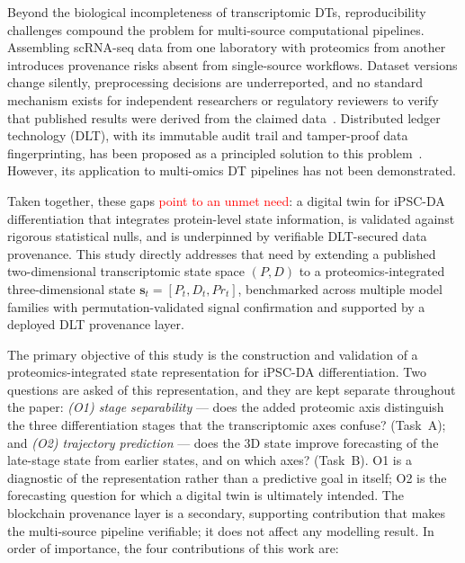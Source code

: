 \documentclass[5p,times,twocolumn]{elsarticle}
\newcommand{\rtag}[1]{}
\newenvironment{revblock}[1]{\par\color{red}\rtag{#1}\ignorespaces}{\par}
\newcommand{\lang}[1]{\textcolor{red}{#1}}
\begin{document}
Beyond the biological incompleteness of transcriptomic DTs, reproducibility challenges compound the problem for multi-source computational pipelines.
Assembling scRNA-seq data from one laboratory with proteomics from another introduces provenance risks absent from single-source workflows. Dataset versions change silently, preprocessing decisions are underreported, and no standard mechanism exists for independent researchers or regulatory reviewers to verify that published results were derived from the claimed data~\cite{johns2023data}.
Distributed ledger technology (DLT), with its immutable audit trail and tamper-proof data fingerprinting, has been proposed as a principled solution to this problem~\cite{kuo2017blockchain}. However, its application to multi-omics DT pipelines has not been demonstrated.

Taken together, these gaps \lang{point to an unmet need}: a digital twin for iPSC-DA
differentiation that integrates protein-level state
information, is validated against rigorous statistical
nulls, and is underpinned by verifiable DLT-secured
data provenance.
This study directly addresses that need by extending
a published two-dimensional transcriptomic state
space $(P, D)$ to a proteomics-integrated
three-dimensional state
$\mathbf{s}_{t} = [P_{t}, D_{t}, Pr_{t}]$,
benchmarked across multiple model families with
permutation-validated signal confirmation and
supported by a deployed DLT provenance layer.

\begin{revblock}{R1.1,R2.1,R2.21}
The primary objective of this study is
  the construction and validation of a proteomics-integrated
  state representation for iPSC-DA differentiation. Two
  questions are asked of this representation, and they are
  kept separate throughout the paper:
  \textit{(O1) stage separability} --- does the added
  proteomic axis distinguish the three differentiation stages
  that the transcriptomic axes confuse? (Task~A); and
  \textit{(O2) trajectory prediction} --- does the 3D state
  improve forecasting of the late-stage state from earlier
  states, and on which axes? (Task~B).
  O1 is a diagnostic of the representation rather than a
  predictive goal in itself; O2 is the forecasting question
  for which a digital twin is ultimately intended.
  The blockchain provenance layer is a secondary, supporting
  contribution that makes the multi-source pipeline
  verifiable; it does not affect any modelling result.
  In order of importance, the four contributions of this
  work are:
\end{revblock}
\end{document}
